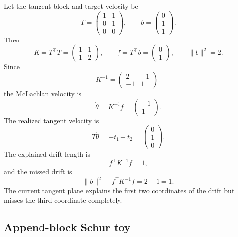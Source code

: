 \documentclass[10pt,twocolumn]{article}
\begin{document}
Let the tangent block and target velocity be
\begin{equation}
T=\begin{pmatrix}
1&1\\
0&1\\
0&0
\end{pmatrix},
\qquad
b=\begin{pmatrix}0\\1\\1\end{pmatrix}.
\end{equation}
Then
\begin{equation}
K=T^\top T=
\begin{pmatrix}1&1\\1&2\end{pmatrix},
\qquad
f=T^\top b=
\begin{pmatrix}0\\1\end{pmatrix},
\qquad
\|b\|^2=2.
\end{equation}
Since
\begin{equation}
K^{-1}=
\begin{pmatrix}2&-1\\-1&1\end{pmatrix},
\end{equation}
the McLachlan velocity is
\begin{equation}
\dot\theta=K^{-1}f
=
\begin{pmatrix}-1\\1\end{pmatrix}.
\end{equation}
The realized tangent velocity is
\begin{equation}
T\dot\theta
=
-t_1+t_2
=
\begin{pmatrix}0\\1\\0\end{pmatrix}.
\end{equation}
The explained drift length is
\begin{equation}
f^\top K^{-1}f=1,
\end{equation}
and the missed drift is
\begin{equation}
\|b\|^2-f^\top K^{-1}f=2-1=1.
\end{equation}
The current tangent plane explains the first two coordinates of the drift but misses the third coordinate completely.

\subsection{Append-block Schur toy}
\end{document}

